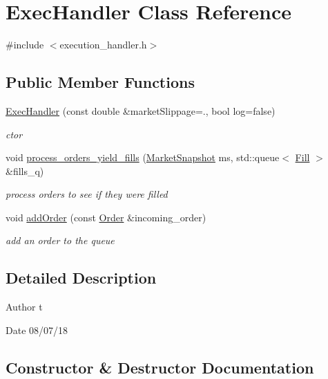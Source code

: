 \hypertarget{classExecHandler}{}\section{Exec\+Handler Class Reference}
\label{classExecHandler}


{\ttfamily \#include $<$execution\+\_\+handler.\+h$>$}

\subsection*{Public Member Functions}
\begin{DoxyCompactItemize}
\item 
\hyperlink{classExecHandler_add4ac09590533aa6a58920cb3c3da0b8}{Exec\+Handler} (const double \&market\+Slippage=., bool log=false)
\begin{DoxyCompactList}\small\item\em ctor \end{DoxyCompactList}\item 
void \hyperlink{classExecHandler_a041152ee704c3688b1097babbc830494}{process\+\_\+orders\+\_\+yield\+\_\+fills} (\hyperlink{classMarketSnapshot}{Market\+Snapshot} ms, std\+::queue$<$ \hyperlink{classFill}{Fill} $>$ \&fills\+\_\+q)
\begin{DoxyCompactList}\small\item\em process orders to see if they were filled \end{DoxyCompactList}\item 
void \hyperlink{classExecHandler_aee7a8bd39ed6fc1f9818c22103c0820a}{add\+Order} (const \hyperlink{classOrder}{Order} \&incoming\+\_\+order)
\begin{DoxyCompactList}\small\item\em add an order to the queue \end{DoxyCompactList}\end{DoxyCompactItemize}


\subsection{Detailed Description}
\begin{DoxyAuthor}{Author}
t 
\end{DoxyAuthor}
\begin{DoxyDate}{Date}
08/07/18 
\end{DoxyDate}


\subsection{Constructor \& Destructor Documentation}
\mbox{\label{classExecHandler_add4ac09590533aa6a58920cb3c3da0b8}} 
